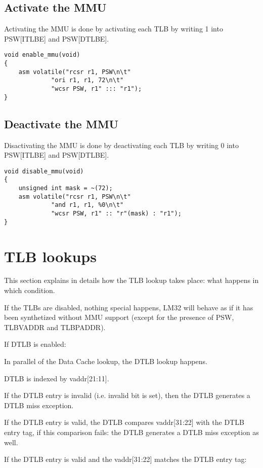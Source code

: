 \documentclass[a4paper,11pt]{article}
\begin{document}
\subsection{Activate the MMU}

Activating the MMU is done by activating each TLB by writing 1 into PSW[ITLBE] and PSW[DTLBE].

\begin{lstlisting}
void enable_mmu(void)
{
	asm volatile("rcsr r1, PSW\n\t"
		     "ori r1, r1, 72\n\t"
		     "wcsr PSW, r1" ::: "r1");
}
\end{lstlisting}

\subsection{Deactivate the MMU}

Disactivating the MMU is done by deactivating each TLB by writing 0 into PSW[ITLBE] and PSW[DTLBE].

\begin{lstlisting}
void disable_mmu(void)
{
	unsigned int mask = ~(72);
	asm volatile("rcsr r1, PSW\n\t"
		     "and r1, r1, %0\n\t"
		     "wcsr PSW, r1" :: "r"(mask) : "r1");
}
\end{lstlisting}

\section{TLB lookups}

This section explains in details how the TLB lookup takes place: what happens in which condition.

If the TLBs are disabled, nothing special happens, LM32 will behave as if it has been synthetized without MMU support (except for the presence of PSW, TLBVADDR and TLBPADDR).

If DTLB is enabled:

In parallel of the Data Cache lookup, the DTLB lookup happens.

DTLB is indexed by vaddr[21:11].

If the DTLB entry is invalid (i.e. invalid bit is set), then the DTLB generates a DTLB miss exception.

If the DTLB entry is valid, the DTLB compares vaddr[31:22] with the DTLB entry tag, if this comparison fails: the DTLB generates a DTLB miss exception as well.

If the DTLB entry is valid and the vaddr[31:22] matches the DTLB entry tag:
\end{document}
